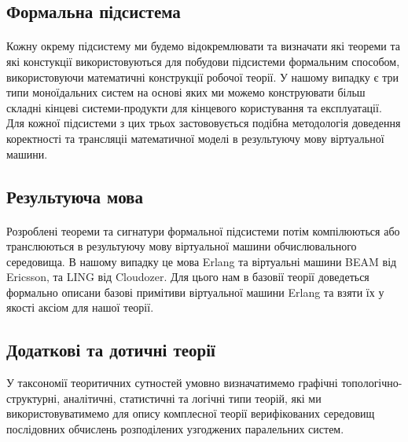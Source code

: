 \documentclass[11pt,oneside]{article}
\begin{document}
\subsection*{Формальна підсистема}

   \paragraph{}
   Кожну окрему підсистему ми будемо відокремлювати та визначати які теореми
   та які констукції використовуються для побудови підсистеми формальним способом,
   використовуючи математичні конструкції робочої теорії. У нашому випадку є три
   типи моноїдальних систем на основі яких ми можемо конструювати більш складні
   кінцеві системи-продукти для кінцевого користування та експлуатації.
   Для кожної підсистеми з цих трьох застововується подібна методологія
   доведення коректності та трансляціі математичної моделі в результуючу
   мову віртуальної машини.

\subsection*{Результуюча мова}

   \paragraph{}
   Розроблені теореми та сигнатури
   формальної підсистеми потім компілюються або транслюються в результуючу мову віртуальної машини
   обчислювального середовища. В нашому випадку це мова Erlang та віртуальні
   машини BEAM від Ericsson, та LING від Cloudozer. Для цього нам в базовії теорії доведеться
   формально описани базові примітиви віртуальної машини Erlang та взяти їх
   у якості аксіом для нашої теорії.

\newpage
\subsection{Додаткові та дотичні теорії}
\vspace{0.5cm}
   У таксономії теоритичних сутностей умовно визначатимемо
   графічні топологічно- структурні, аналітичні, статистичні та логічні типи теорій, які
   ми використовуватимемо для опису комплесної теорії верифікованих середовищ
   послідовних обчислень розподілених узгоджених паралельних систем.\\
\end{document}
